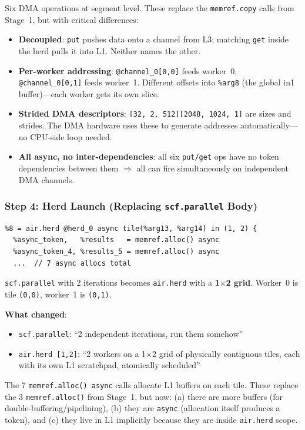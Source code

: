 \documentclass[11pt,a4paper]{article}
\begin{document}
Six DMA operations at segment level. These replace the \texttt{memref.copy} calls
from Stage~1, but with critical differences:
\begin{itemize}[leftmargin=2em]
  \item \textbf{Decoupled}: \texttt{put} pushes data onto a channel from L3;
    matching \texttt{get} inside the herd pulls it into L1. Neither names the other.
  \item \textbf{Per-worker addressing}: \texttt{@channel\_0[0,0]} feeds worker~0,
    \texttt{@channel\_0[0,1]} feeds worker~1. Different offsets into \texttt{\%arg8}
    (the global in1 buffer)---each worker gets its own slice.
  \item \textbf{Strided DMA descriptors}: \texttt{[32, 2, 512][2048, 1024, 1]} are
    sizes and strides. The DMA hardware uses these to generate addresses
    automatically---no CPU-side loop needed.
  \item \textbf{All async, no inter-dependencies}: all six \texttt{put/get} ops have
    no token dependencies between them $\Rightarrow$ all can fire simultaneously on
    independent DMA channels.
\end{itemize}

\subsubsection{Step 4: Herd Launch (Replacing \texttt{scf.parallel} Body)}
\begin{lstlisting}
%8 = air.herd @herd_0 async tile(%arg13, %arg14) in (1, 2) {
  %async_token,   %results   = memref.alloc() async
  %async_token_4, %results_5 = memref.alloc() async
  ...  // 7 async allocs total
\end{lstlisting}

\texttt{scf.parallel} with 2 iterations becomes \texttt{air.herd} with a
\textbf{1$\times$2 grid}. Worker~0 is tile \texttt{(0,0)}, worker~1 is
\texttt{(0,1)}.

\textbf{What changed}:
\begin{itemize}[leftmargin=2em]
  \item \texttt{scf.parallel}: ``2 independent iterations, run them somehow''
  \item \texttt{air.herd [1,2]}: ``2 workers on a 1$\times$2 grid of physically
    contiguous tiles, each with its own L1 scratchpad, atomically scheduled''
\end{itemize}

The 7 \texttt{memref.alloc() async} calls allocate L1 buffers on each tile. These
replace the 3 \texttt{memref.alloc()} from Stage~1, but now: (a) there are more
buffers (for double-buffering/pipelining), (b) they are \texttt{async} (allocation
itself produces a token), and (c) they live in L1 implicitly because they are inside
\texttt{air.herd} scope.
\end{document}
